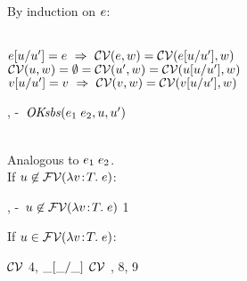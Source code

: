 By induction on $e$:
\begin{bycase}
\Case{$\opO$, $\descopO$, $\pjop{\fnam}$}\\
$e[u/u']=e\ \Rightarrow\ 
 \mathcal{CV}(e,w)=\mathcal{CV}(e[u/u'],w)$
\Case{$\varI$}\\
$\mathcal{CV}(u,w)=
 \emptyset=
 \mathcal{CV}(u',w)=
 \mathcal{CV}(u[u/u'],w)$
\Case{$\var\neq\varI$}\\
$v[u/u']=v\ \Rightarrow\ 
 \mathcal{CV}(v,w)=\mathcal{CV}(v[u/u'],w)$
\Case{$\appO$}
\begin{derivation}
     {, \hyp\ $\mathit{OKsbs}(e_1\;e_2,u,u')$}
\steP
{\cvarv{\appO}{\varII}
 \linK{=}
 \cup{}
 \cup
 \linK{=}
 \linK{=}
 \cvarv{\esbsren{(\appO)}}{\varII}}
\end{derivation}
\Case{$\eqO$, $\iifO$}\\
Analogous to $\appO$.
\Case{$\absO$}\\
If $u\not\in\mathcal{FV}(\lambda v\!:\!T.\;e)$:
\begin{derivation}
\step{\esbsren{(\absO)}=\absO}
     {, \hyp\ $u\not\in\mathcal{FV}(\lambda v\!:\!T.\;e)$}
\step{\cvarv{\absO}{\varII}=\cvarv{\esbsren{(\absO)}}{\varII}}
     {1}
\end{derivation}
\noindent
If $u\in\mathcal{FV}(\lambda v\!:\!T.\;e)$:
\begin{derivation}
\step{\cvarv{\absO}{\varII}=
      \cond{\varII\in\efvar{\expr}-\setI{\var}}
           {\setI{\var}\cup\cvarv{\expr}{\varII}}
           {\emptyset}}
     {$\mathcal{CV}$}
\step{\varI\in\efvar{\absO}}{\hyp}
\step{\cvarv{\esbsren{(\absO)}}{\varII}=
      \cvarv{\abs{\var}{\typ}{\esbsren{\expr}}}{\varII}}
     {4, $\_[\_/\_]$}
\step{\cvarv{\abs{\var}{\typ}{\esbsren{\expr}}}{\varII}=
      \cond{\varII\in\efvar{\esbsren{\expr}}-\setI{\var}}
           {\setI{\var}\cup\cvarv{\esbsren{\expr}}{\varII}}
           {\emptyset}}
     {$\mathcal{CV}$}
\step{\cvarv{\expr}{\varII}=\cvarv{\esbsren{\expr}}{\varII}}
     {\indhyp, 8, 9}
\step{\efvar{\esbsren{\expr}}=
}
\end{derivation}
\end{bycase}
